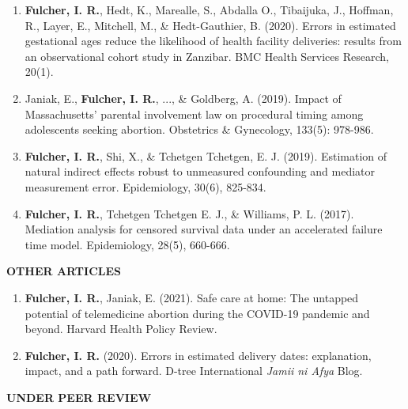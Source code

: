 \documentclass[12pt]{article}
\begin{document}
\begin{enumerate}
	\item \textbf{Fulcher, I. R.}, Hedt, K., Marealle, S., Abdalla O., Tibaijuka, J., Hoffman, R., Layer, E., Mitchell, M., \& Hedt-Gauthier, B. (2020). Errors in estimated gestational ages reduce the likelihood of health facility deliveries: results from an observational cohort study in Zanzibar. BMC Health Services Research, 20(1).
	
	\item Janiak, E., \textbf{Fulcher, I. R.}, ..., \& Goldberg, A. (2019). Impact of Massachusetts' parental involvement law on procedural timing among adolescents seeking abortion. Obstetrics \& Gynecology, 133(5): 978-986.

	\item \textbf{Fulcher, I. R.}, Shi, X., \& Tchetgen Tchetgen, E. J. (2019). Estimation of natural indirect effects robust to unmeasured confounding and mediator measurement error. Epidemiology, 30(6), 825-834.
	
	\item \textbf{Fulcher, I. R.}, Tchetgen Tchetgen E. J., \& Williams, P. L. (2017). Mediation analysis for censored survival data under an accelerated failure time model.  Epidemiology, 28(5), 660-666. 
		
\end{enumerate}

\noindent \textbf{OTHER ARTICLES}
	
	\begin{enumerate}
		\setcounter{enumi}{0}
		
		\item \textbf{Fulcher, I. R.}, Janiak, E. (2021). Safe care at home: The untapped potential of telemedicine abortion during the COVID-19 pandemic and beyond. Harvard Health Policy Review. 
		
		\item \textbf{Fulcher, I. R.} (2020).  Errors in estimated delivery dates: explanation, impact, and a path forward. D-tree International \textit{Jamii ni Afya} Blog. 
	
\end{enumerate}


\noindent \textbf{UNDER PEER REVIEW}
\end{document}
